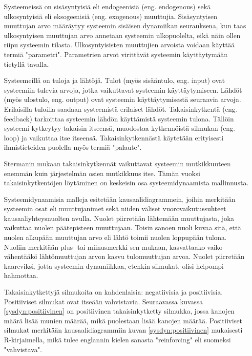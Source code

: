 \documentclass[finnish,12pt,a4paper,pdftex]{article}
\begin{document}
\begin{onehalfspacing}
Systeemeissä on sisäsyntyisiä eli endogeenisiä (eng. endogenous) sekä ulkosyntyisiä eli eksogeenisiä (eng. exogenous) muuttujia. Sisäsyntyisen muuttujan arvo määräytyy systeemin sisäisen dynamiikan seurauksena, kun taas ulkosyntyisen muuttujan arvo annetaan systeemin ulkopuolelta, eikä näin ollen riipu systeemin tilasta. Ulkosyntyisisten muuttujien arvoista voidaan käyttää termiä "parametri". Parametrien arvot virittävät systeemin käyttäytymään tietyllä tavalla. \cite{Sterman2000} %

Systeemeillä on tuloja ja lähtöjä. Tulot (myös sisääntulo, eng. input) ovat systeemiin tulevia arvoja, jotka vaikuttavat systeemin käyttäytymiseen. Lähdöt (myös ulostulo, eng. output) ovat systeemin käyttäytymisestä seuraavia arvoja. Erilaisilla tuloilla saadaan systeemistä erilaiset lähdöt. Takaisinkytkentä (eng. feedback) tarkoittaa systeemin lähdön käyttämistä systeemin tulona. Tällöin systeemi kytkeytyy takaisin itseensä, muodostaa kytkennöistä silmukan (eng. loop) ja vaikuttaa itse itseensä. Takaisinkytkennästä käytetään erityisesti ihmistieteiden puolella myös termiä "palaute". \cite{Sterman2000, WhatIsSystemDynamics} %

Stermanin \cite[s. 12]{Sterman2000} mukaan takaisinkytkennät vaikuttavat systeemin mutkikkuuteen enemmän kuin järjestelmän osien mutkikkuus itse. Tämän vuoksi takaisinkytkentöjen löytäminen on keskeisin osa systeemidynaamista mallinnusta. 

Systeemidynaamisia malleja esitetään kausaalidiagrammein, joihin merkitään systeemin osat eli muuttujanimet sekä niiden väliset vuorovaikutussuhteet kausaaliyhteysnuolten avulla. Nuolet piirretään lähtemään muuttujasta, joka vaikuttaa nuolen päätepisteen muuttujaan. Toisin sanoen nuoli kuvaa sitä, että nuolen alkupään muuttujan arvo eli lähtö toimii nuolen loppupään tulona. Nuoliin merkitään plus- tai miinusmerkki sen mukaan, kasvattaako vaiko vähentääkö lähtömuuttujan arvon kasvu tulomuuttujan arvoa. Nuolet piirretään kaareviksi, jotta systeemin dynamiikkaa, etenkin silmukat, olisi helpompi hahmottaa. \cite{Sterman2000}

\clearpage

Takaisinkytkettyjä silmukoita on kahdenlaisia: negatiivisia ja positiivisia. Positiiviset silmukat ovat itseään vahvistavia. Seuraavassa kuvassa \ref{sysdyn:positiivinen} on positiivinen takaisinkytketty silmukka, jossa kanojen määrä lisää munien määrää, mikä puolestaan lisää kanojen määrää. Positiiviset silmukat merkitään kausaalidiagrammiin kuvan \ref{sysdyn:positiivinen} mukaisesti R-kirjaimella, mikä tulee englannin kielen sanasta "reinforcing" eli suomeksi "vahvistava". \cite[s. 12--13]{Sterman2000}\cite{WhatIsSystemDynamics}


\end{onehalfspacing}
\end{document}
